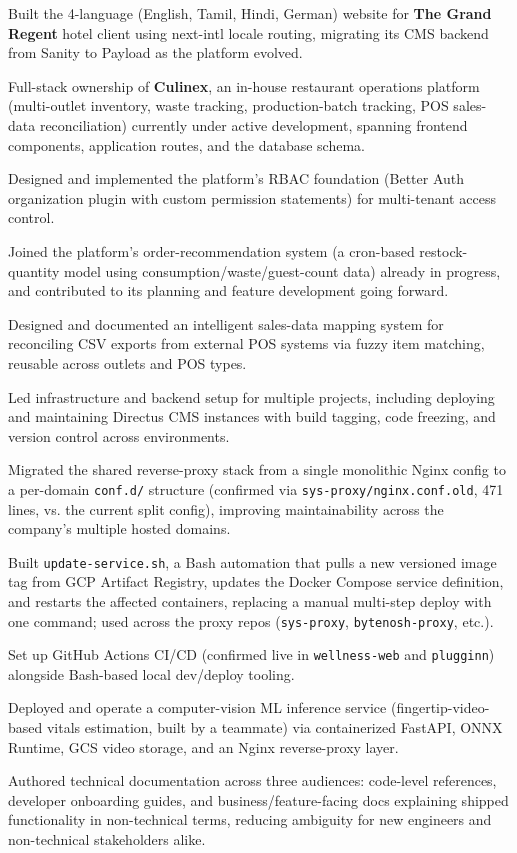\documentclass[letterpaper,11pt]{article}
\newcommand{\resumeItem}[1]{
  \item\small{
    {#1 \vspace{-2pt}}
  }
}
\begin{document}
        \resumeItem{Built the 4-language (English, Tamil, Hindi, German) website for \textbf{The Grand Regent} hotel client using next-intl locale routing, migrating its CMS backend from Sanity to Payload as the platform evolved.}
        \resumeItem{Full-stack ownership of \textbf{Culinex}, an in-house restaurant operations platform (multi-outlet inventory, waste tracking, production-batch tracking, POS sales-data reconciliation) currently under active development, spanning frontend components, application routes, and the database schema.}
        \resumeItem{Designed and implemented the platform's RBAC foundation (Better Auth organization plugin with custom permission statements) for multi-tenant access control.}
        \resumeItem{Joined the platform's order-recommendation system (a cron-based restock-quantity model using consumption/waste/guest-count data) already in progress, and contributed to its planning and feature development going forward.}
        \resumeItem{Designed and documented an intelligent sales-data mapping system for reconciling CSV exports from external POS systems via fuzzy item matching, reusable across outlets and POS types.}
        \resumeItem{Led infrastructure and backend setup for multiple projects, including deploying and maintaining Directus CMS instances with build tagging, code freezing, and version control across environments.}
        \resumeItem{Migrated the shared reverse-proxy stack from a single monolithic Nginx config to a per-domain \texttt{conf.d/} structure (confirmed via \texttt{sys-proxy/nginx.conf.old}, 471 lines, vs. the current split config), improving maintainability across the company's multiple hosted domains.}
        \resumeItem{Built \texttt{update-service.sh}, a Bash automation that pulls a new versioned image tag from GCP Artifact Registry, updates the Docker Compose service definition, and restarts the affected containers, replacing a manual multi-step deploy with one command; used across the proxy repos (\texttt{sys-proxy}, \texttt{bytenosh-proxy}, etc.).}
        \resumeItem{Set up GitHub Actions CI/CD (confirmed live in \texttt{wellness-web} and \texttt{plugginn}) alongside Bash-based local dev/deploy tooling.}
        \resumeItem{Deployed and operate a computer-vision ML inference service (fingertip-video-based vitals estimation, built by a teammate) via containerized FastAPI, ONNX Runtime, GCS video storage, and an Nginx reverse-proxy layer.}
        \resumeItem{Authored technical documentation across three audiences: code-level references, developer onboarding guides, and business/feature-facing docs explaining shipped functionality in non-technical terms, reducing ambiguity for new engineers and non-technical stakeholders alike.}
\end{document}

